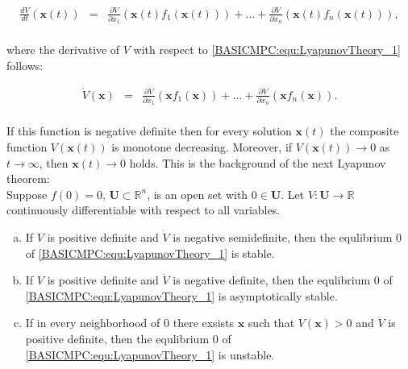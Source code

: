 	\begin{equation}
        \begin{array}{rcl}
				\frac{dV}{dt}(\boldsymbol{x}(t))&=&\frac{\partial V}{\partial x_1}(\boldsymbol{x}(t)f_1(\boldsymbol{x}(t)))+\dots+\frac{\partial V}{\partial x_n}(\boldsymbol{x}(t)f_n(\boldsymbol{x}(t))),\\
        \end{array}
        \label{BASICMPC:equ:LyapunovTheory_2}
    \end{equation}
		
		where the derivative of $V$ with respect to \ref{BASICMPC:equ:LyapunovTheory_1} follows:
		
		\begin{equation}
        \begin{array}{rcl}
				\dot{V}(\boldsymbol{x})&=&\frac{\partial V}{\partial x_1}(\boldsymbol{x}f_1(\boldsymbol{x}))+\dots+\frac{\partial V}{\partial x_n}(\boldsymbol{x}f_n(\boldsymbol{x})).\\
        \end{array}
        \label{BASICMPC:equ:LyapunovTheory_3}
    \end{equation}
		
		If this function is negative definite then for every solution $\boldsymbol{x}(t)$ the composite function $V(\boldsymbol{x}(t))$ is monotone decreasing. Moreover, if  $V(\boldsymbol{x}(t))\longrightarrow 0$ as $t\longrightarrow \infty$, then $\boldsymbol{x}(t)\longrightarrow 0$ holds. This is the background of the next Lyapunov theorem:\\
		Suppose $f(0)=0$, $\textbf{U}\subset\mathbb{R}^n$, is an open set with $0\in \textbf{U}$. Let $V:\textbf{U}\longrightarrow\mathbb{R}$ continuously differentiable with respect to all variables.
		\begin{enumerate}[a)] %
		\item If $V$ is positive definite and $\dot{V}$ is negative semidefinite, then the equlibrium $0$ of \ref{BASICMPC:equ:LyapunovTheory_1} is stable.
		\item If $V$ is positive definite and $\dot{V}$ is negative definite, then the equlibrium $0$ of \ref{BASICMPC:equ:LyapunovTheory_1} is asymptotically stable.
		\item If in every neighborhood of $0$ there exsists $\boldsymbol{x}$ such that $V(\boldsymbol{x})>0$ and $\dot{V}$ is positive definite, then the equlibrium $0$ of \ref{BASICMPC:equ:LyapunovTheory_1} is unstable.
\end{enumerate}

